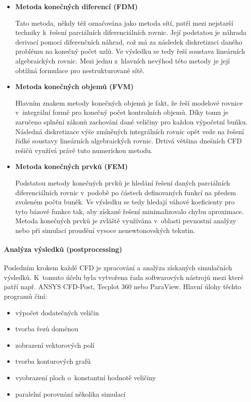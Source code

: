 \begin{itemize}[itemsep=0pt,parsep=0pt,partopsep=0pt,topsep=0pt]
  \item \textbf{Metoda konečných diferencí (FDM)}
  
  Tato metoda, někdy též označována jako metoda sítí, patří mezi nejstarší techniky k~řešení parciálních diferenciálních rovnic. Její podstatou je náhrada derivací pomocí diferenčních náhrad, což má za následek diskretizaci daného problému na konečný počet uzlů. Ve výsledku se tedy řeší soustava lineárních algebraických rovnic. Mezi jednu z~hlavních nevýhod této metody je její obtížná formulace pro nestrukturované sítě. 
  \item \textbf{Metoda konečných objemů (FVM)}
  
  Hlavním znakem metody konečných objemů je fakt, že řeší modelové rovnice v~integrální formě pro konečný počet kontrolních objemů. Díky tomu je zaručeno splnění zákonů zachování dané veličiny pro každou výpočetní buňku. Následná diskretizace výše zmíněných integrálních rovnic opět vede na řešení řídké soustavy lineárních algebraických rovnic. Drtivá většina dnešních CFD rešičů využívá právě tuto numerickou metodu. 
  
  \item \textbf{Metoda konečných prvků (FEM)}
  
  Podstatou metody konečných prvků je hledání řešení daných parciálních diferenciálních rovnic v~podobě po částech definovaných funkcí na předem zvoleném počtu buněk. Ve výsledku se tedy hledají váhové koeficienty pro tyto bázové funkce tak, aby získané řešení minimalizovalo chybu aproximace. Metoda konečných prvků je zvláště využívána v~oblasti pevnostní analýzy nebo při simulaci proudění vysoce nenewtonovských tekutin.  
\end{itemize}

\paragraph{Analýza výsledků (postprocessing)}
Posledním krokem každé CFD je zpracování a analýza získaných simulačních výsledků. K~tomuto účelu byla vytvořena řada softwarových nástrojů mezi které patří např. ANSYS CFD-Post, Tecplot 360 nebo ParaView. Hlavní úlohy těchto programů činí:

\begin{itemize}[itemsep=0pt,parsep=0pt,partopsep=0pt,topsep=0pt]
  \item výpočet dodatečných veličin
  \item tvorba řezů doménou
  \item zobrazení vektorových polí
  \item tvorba konturových grafů
  \item vyobrazení ploch o~konstantní hodnotě veličiny
  \item paralelní porovnání několika simulací
\end{itemize}

